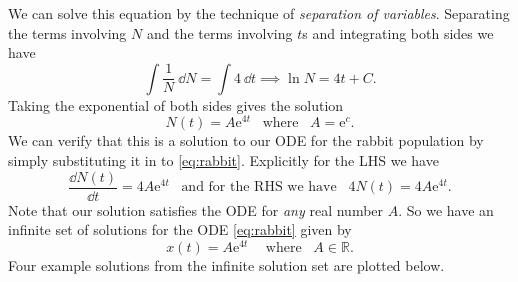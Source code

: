 We can solve this equation by the technique of {\em separation of variables}. Separating the terms involving $N$ and the terms involving $t$s and integrating both sides we have
\begin{equation*}
 \int \frac{1}{N} \:\dd N = \int 4\:\dd t \implies \ln{N} = 4t + C.
\end{equation*}
Taking the exponential of both sides gives the solution
\begin{equation*}
 N(t)=A\text{e}^{4t}\hspace{10pt}\text{where}\hspace{10pt} A=\text{e}^{c}.
\end{equation*}
We can verify that this is a solution to our ODE for the rabbit population by simply substituting it in to \eqref{eq:rabbit}. Explicitly for the LHS we have
\begin{equation*}
 \frac{ \dd N(t)}{\dd t} = 4A\text{e}^{4t}\hspace{10pt}\text{and for the RHS we have}\hspace{10pt}4N(t)=4A\text{e}^{4t}.
\end{equation*}
Note that our solution satisfies the ODE for {\em any} real number $A$. So we have an infinite set of solutions for the ODE \eqref{eq:rabbit} given by
\begin{equation}\label{eq:gensol}
 x(t)= A\text{e}^{4t} \hspace{15pt}\text{where}\hspace{10pt} A \in \mathbb{R}.
\end{equation}
Four example solutions from the infinite solution set are plotted below.
